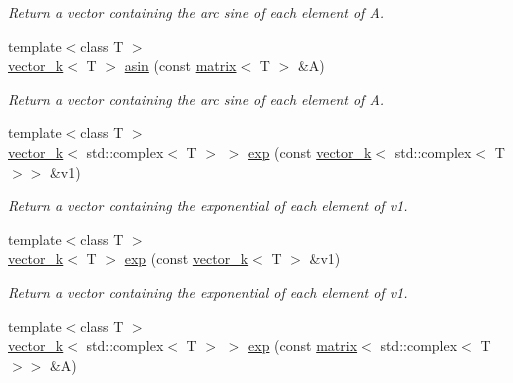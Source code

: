 \begin{DoxyCompactItemize}
\begin{DoxyCompactList}\small\item\em Return a vector containing the arc sine of each element of A. \end{DoxyCompactList}\item 
\hypertarget{namespacekeycpp_a25e9b69ef51cf53cc780fd5a99bcde1b}{{\footnotesize template$<$class T $>$ }\\\hyperlink{classkeycpp_1_1vector__k}{vector\-\_\-k}$<$ T $>$ \hyperlink{namespacekeycpp_a25e9b69ef51cf53cc780fd5a99bcde1b}{asin} (const \hyperlink{classkeycpp_1_1matrix}{matrix}$<$ T $>$ \&A)}\label{namespacekeycpp_a25e9b69ef51cf53cc780fd5a99bcde1b}

\begin{DoxyCompactList}\small\item\em Return a vector containing the arc sine of each element of A. \end{DoxyCompactList}\item 
\hypertarget{namespacekeycpp_abb06bdc0fc2627f8f5390e0b1da588c3}{{\footnotesize template$<$class T $>$ }\\\hyperlink{classkeycpp_1_1vector__k}{vector\-\_\-k}$<$ std\-::complex$<$ T $>$ $>$ \hyperlink{namespacekeycpp_abb06bdc0fc2627f8f5390e0b1da588c3}{exp} (const \hyperlink{classkeycpp_1_1vector__k}{vector\-\_\-k}$<$ std\-::complex$<$ T $>$$>$ \&v1)}\label{namespacekeycpp_abb06bdc0fc2627f8f5390e0b1da588c3}

\begin{DoxyCompactList}\small\item\em Return a vector containing the exponential of each element of v1. \end{DoxyCompactList}\item 
\hypertarget{namespacekeycpp_a22e3ee37c7d6c67e9951d9546082b8b8}{{\footnotesize template$<$class T $>$ }\\\hyperlink{classkeycpp_1_1vector__k}{vector\-\_\-k}$<$ T $>$ \hyperlink{namespacekeycpp_a22e3ee37c7d6c67e9951d9546082b8b8}{exp} (const \hyperlink{classkeycpp_1_1vector__k}{vector\-\_\-k}$<$ T $>$ \&v1)}\label{namespacekeycpp_a22e3ee37c7d6c67e9951d9546082b8b8}

\begin{DoxyCompactList}\small\item\em Return a vector containing the exponential of each element of v1. \end{DoxyCompactList}\item 
\hypertarget{namespacekeycpp_a71377e5dee3f47b001950fe0a1858722}{{\footnotesize template$<$class T $>$ }\\\hyperlink{classkeycpp_1_1vector__k}{vector\-\_\-k}$<$ std\-::complex$<$ T $>$ $>$ \hyperlink{namespacekeycpp_a71377e5dee3f47b001950fe0a1858722}{exp} (const \hyperlink{classkeycpp_1_1matrix}{matrix}$<$ std\-::complex$<$ T $>$$>$ \&A)}\label{namespacekeycpp_a71377e5dee3f47b001950fe0a1858722}


\end{DoxyCompactItemize}
